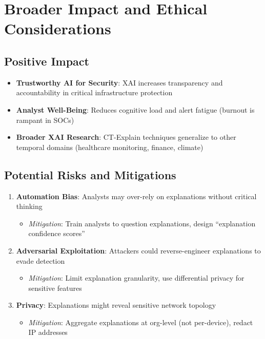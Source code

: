 \documentclass[11pt]{article}
\begin{document}
\section{Broader Impact and Ethical Considerations}

\subsection{Positive Impact}

\begin{itemize}
    \item \textbf{Trustworthy AI for Security}: XAI increases transparency and accountability in critical infrastructure protection
    \item \textbf{Analyst Well-Being}: Reduces cognitive load and alert fatigue (burnout is rampant in SOCs)
    \item \textbf{Broader XAI Research}: CT-Explain techniques generalize to other temporal domains (healthcare monitoring, finance, climate)
\end{itemize}

\subsection{Potential Risks and Mitigations}

\begin{enumerate}
    \item \textbf{Automation Bias}: Analysts may over-rely on explanations without critical thinking
    \begin{itemize}
        \item \textit{Mitigation}: Train analysts to question explanations, design ``explanation confidence scores''
    \end{itemize}

    \item \textbf{Adversarial Exploitation}: Attackers could reverse-engineer explanations to evade detection
    \begin{itemize}
        \item \textit{Mitigation}: Limit explanation granularity, use differential privacy for sensitive features
    \end{itemize}

    \item \textbf{Privacy}: Explanations might reveal sensitive network topology
    \begin{itemize}
        \item \textit{Mitigation}: Aggregate explanations at org-level (not per-device), redact IP addresses
    \end{itemize}
\end{enumerate}
\end{document}
